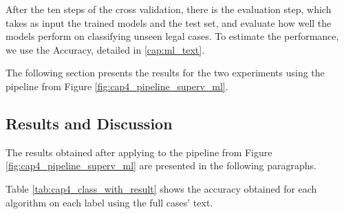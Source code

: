 After the ten steps of the cross validation, there is the evaluation step, which takes as input the trained models and the test set, and evaluate how well the models perform on classifying unseen legal cases. To estimate the performance, we use the Accuracy, detailed in \ref{cap:ml_text}.

The following section presents the results for the two experiments using the pipeline from Figure \ref{fig:cap4_pipeline_superv_ml}.

\subsection{Results and Discussion}


The results obtained after applying to the pipeline from Figure \ref{fig:cap4_pipeline_superv_ml} are presented in the following paragraphs.

Table \ref{tab:cap4_class_with_result} shows the accuracy obtained for each algorithm on each label using the full cases' text.





